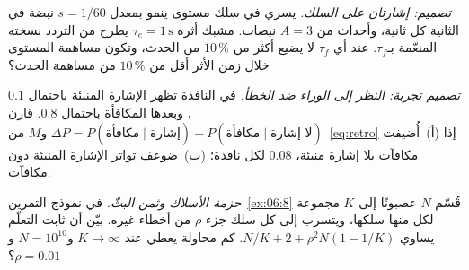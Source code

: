 \begin{exercise}[\lvlB]
\label{ex:07:6}
\emph{تصميم: إشارتان على السلك.} يسري في سلك  مستوى ينمو بمعدل $s=1/60$ نبضة في الثانية كل ثانية، وأحداث من $A=3$ نبضات. مشبك أثره $\tau_e=1\,\text{s}$ يطرح من التردد نسخته المنعّمة بـ$\tau_f$. عند أي $\tau_f$ لا يضيع أكثر من $10\,\%$ من الحدث، وتكون مساهمة المستوى خلال زمن الأثر أقل من $10\,\%$ من مساهمة الحدث؟
\end{exercise}

\begin{exercise}[\lvlB]
\label{ex:07:7}
\emph{تصميم تجربة: النظر إلى الوراء ضد الخطأ.} في النافذة تظهر الإشارة المنبئة باحتمال $0.1$، وبعدها المكافأة باحتمال $0.8$. قارن $\Delta P=P(\text{مكافأة}\mid\text{إشارة})-P(\text{مكافأة}\mid\text{لا إشارة})$ و$M$ من~\eqref{eq:retro} إذا (أ)~أُضيفت مكافآت بلا إشارة منبئة، $0.08$ لكل نافذة؛ (ب)~ضوعف تواتر الإشارة المنبئة دون مكافآت.
\end{exercise}

\begin{exercise}[\lvlC]
\label{ex:07:8}
\emph{حزمة الأسلاك وثمن البثّ.} في نموذج التمرين~\ref{ex:06:8} قُسّم $N$ عصبونًا إلى $K$ مجموعة لكل منها سلكها، ويتسرب إلى كل سلك جزء $\rho$ من أخطاء غيره. بيّن أن ثابت التعلّم يساوي $N/K+2+\rho^2N(1-1/K)$. كم محاولة يعطي عند $K\to\infty$ و$N=10^{10}$ و$\rho=0.01$؟
\end{exercise}
